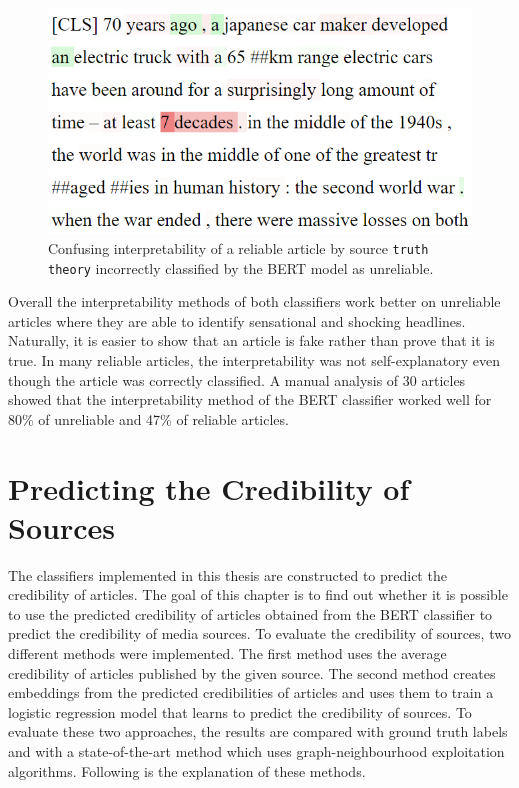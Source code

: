 \begin{figure}[H]
    \centering
    \includegraphics[scale=0.6]{obrazky-figures/truth-theory4.png}
    \caption{Confusing interpretability of a reliable article by source \texttt{truth theory} incorrectly classified by the BERT model as unreliable.}
    \label{fig:truth_disc2}
\end{figure}

Overall the interpretability methods of both classifiers work better on unreliable articles where they are able to identify sensational and shocking headlines. Naturally, it is easier to show that an article is fake rather than prove that it is true. In many reliable articles, the interpretability was not self-explanatory even though the article was correctly classified. A manual analysis of 30 articles showed that the interpretability method of the BERT classifier worked well for 80\% of unreliable and 47\% of reliable articles.



\chapter{Predicting the Credibility of Sources}
\label{chap:source_credibility}
The classifiers implemented in this thesis are constructed to predict the credibility of articles. The goal of this chapter is to find out whether it is possible to use the predicted credibility of articles obtained from the BERT classifier to predict the credibility of media sources. To evaluate the credibility of sources, two different methods were implemented. The first method uses the average credibility of articles published by the given source. The second method creates embeddings from the predicted credibilities of articles and uses them to train a logistic regression model that learns to predict the credibility of sources.
To evaluate these two approaches, the results are compared with ground truth labels and with a state-of-the-art method which uses graph-neighbourhood exploitation algorithms. Following is the explanation of these methods.



